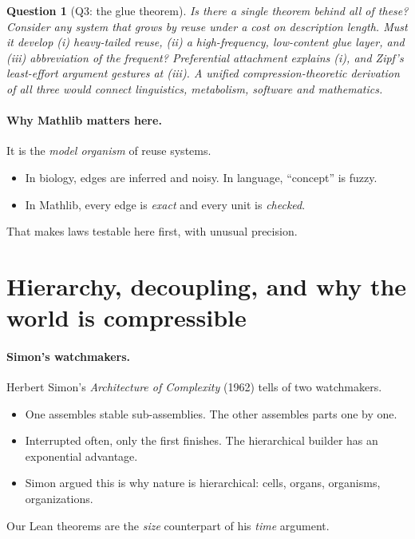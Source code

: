 \documentclass[11pt]{article}
\newtheorem*{question}{Question}
\begin{document}
\begin{question}[Q3: the glue theorem]
Is there a single theorem behind all of these? Consider any system that grows by reuse
under a cost on description length. Must it develop (i) heavy-tailed reuse, (ii) a
high-frequency, low-content glue layer, and (iii) abbreviation of the frequent?
Preferential attachment explains (i), and Zipf's least-effort argument gestures at (iii).
A unified compression-theoretic derivation of all three would connect linguistics,
metabolism, software and mathematics.
\end{question}

\paragraph{Why Mathlib matters here.} It is the \emph{model organism} of reuse systems.
\begin{itemize}
\item In biology, edges are inferred and noisy. In language, ``concept'' is fuzzy.
\item In Mathlib, every edge is \emph{exact} and every unit is \emph{checked}.
\end{itemize}
That makes laws testable here first, with unusual precision.

\section{Hierarchy, decoupling, and why the world is compressible}

\paragraph{Simon's watchmakers.} Herbert Simon's \emph{Architecture of Complexity} (1962)
tells of two watchmakers.
\begin{itemize}
\item One assembles stable sub-assemblies. The other assembles parts one by one.
\item Interrupted often, only the first finishes. The hierarchical builder has an
  exponential advantage.
\item Simon argued this is why nature is hierarchical: cells, organs, organisms,
  organizations.
\end{itemize}
Our Lean theorems are the \emph{size} counterpart of his \emph{time} argument.
\end{document}
